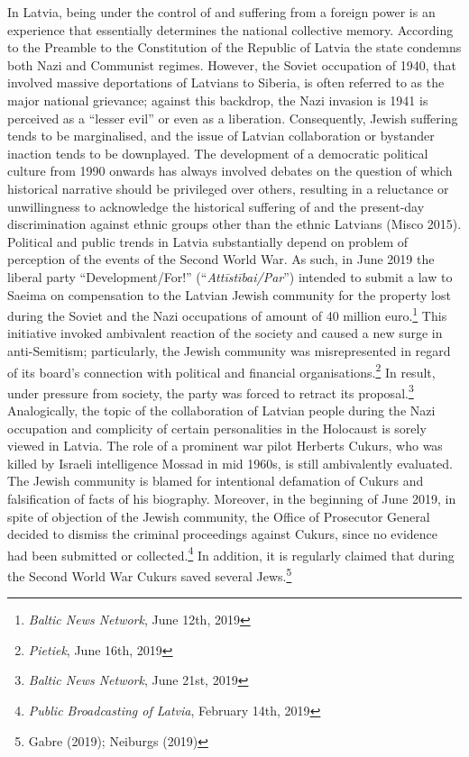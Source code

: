 In Latvia, being under the control of and suffering from a foreign power is an experience that essentially determines the national collective memory. According to the Preamble to the Constitution of the Republic of Latvia the state condemns both Nazi and Communist regimes. However, the Soviet occupation of 1940, that involved massive deportations of Latvians to Siberia, is often referred to as the major national grievance; against this backdrop, the Nazi invasion is 1941 is perceived as a “lesser evil” or even as a liberation. Consequently, Jewish suffering tends to be marginalised, and the issue of Latvian collaboration or bystander inaction tends to be downplayed. The development of a democratic political culture from 1990 onwards has always involved debates on the question of which historical narrative should be privileged over others, resulting in a reluctance or unwillingness to acknowledge the historical suffering of and the present-day discrimination against ethnic groups other than the ethnic Latvians (Misco 2015). \\
Political and public trends in Latvia substantially depend on problem of perception of the events of the Second World War. As such, in June 2019 the liberal party ``Development/For!'' (``\textit{Attīstībai/Par}'') intended to submit a law to Saeima on compensation to the Latvian Jewish community for the property lost during the Soviet and the Nazi occupations of amount of 40 million euro.\footnote{\textit{Baltic News Network}, June 12th, 2019} This initiative invoked ambivalent reaction of the society and caused a new surge in anti-Semitism; particularly, the Jewish community was misrepresented in regard of its board’s connection with political and financial organisations.\footnote{\textit{Pietiek}, June 16th, 2019} In result, under pressure from society, the party was forced to retract its proposal.\footnote{\textit{Baltic News Network}, June 21st, 2019}\\  
Analogically, the topic of the collaboration of Latvian people during the Nazi occupation and complicity of certain personalities in the Holocaust is sorely viewed in Latvia. The role of a prominent war pilot Herberts Cukurs, who was killed by Israeli intelligence Mossad in mid 1960s, is still ambivalently evaluated. The Jewish community is blamed for intentional defamation of Cukurs and falsification of facts of his biography. Moreover, in the beginning of June 2019, in spite of objection of the Jewish community, the Office of Prosecutor General decided to dismiss the criminal proceedings against Cukurs, since no evidence had been submitted or collected.\footnote{\textit{Public Broadcasting of Latvia}, February 14th, 2019} In addition, it is regularly claimed that during the Second World War Cukurs saved several Jews.\footnote{Gabre (2019); Neiburgs (2019)}\\
